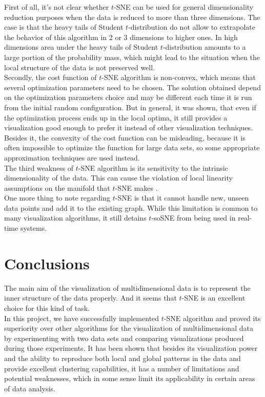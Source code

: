 First of all, it's not clear whether $t$-SNE can be used for general dimensionality reduction purposes when the data is reduced to more than three dimensions. The case is that the heavy tails of Student $t$-distribution do not allow to extrapolate the behavior of this algorithm in 2 or 3 dimensions to higher ones. In high dimensions area under the heavy tails of Student $t$-distribution amounts to a large portion of the probability mass, which might lead to the situation when the local structure of the data is not preserved well. \\

Secondly, the cost function of $t$-SNE algorithm is non-convex, which means that several optimization parameters need to be chosen. The solution obtained depend on the optimization parameters choice and may be different each time it is run from the initial random configuration. But in general, it was shown, that even if the optimization process ends up in the local optima, it still provides a visualization good enough to prefer it instead of other visualization techniques. Besides it, the convexity of the cost function can be misleading, because it is often impossible to optimize the function for large data sets, so some appropriate approximation techniques are used instead. \\

The third weakness of $t$-SNE algorithm is its sensitivity to the intrinsic dimensionality of the data. This can cause the violation of local linearity assumptions on the manifold that $t$-SNE makes \cite{tsnearticle}.\\

One more thing to note regarding $t$-SNE is that it cannot handle new, unseen data points and add it to the existing graph. While this limitation is common to many visualization algorithms, it still detains $t$-soSNE from being used in real-time systems.

\section{Conclusions}

The main aim of the visualization of multidimensional data is to represent the inner structure of the data properly. And it seems that $t$-SNE is an excellent choice for this kind of task.\\

In this project, we have successfully implemented $t$-SNE algorithm and proved its superiority over other algorithms for the visualization of multidimensional data by experimenting with two data sets and comparing visualizations produced during those experiments. It has been shown that besides its visualization power and the ability to reproduce both local and global patterns in the data and provide excellent clustering capabilities, it has a number of limitations and potential weaknesses, which in some sense limit its applicability in certain areas of data analysis.

